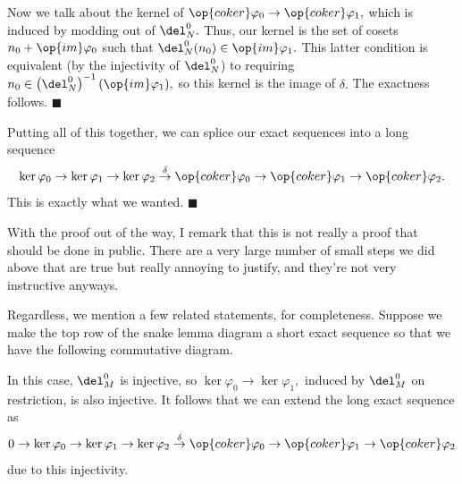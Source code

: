 Now we talk about the kernel of $\op{coker}\varphi_0\to\op{coker}\varphi_1,$ which is induced by modding out of $\del_N^0.$ Thus, our kernel is the set of cosets $n_0+\op{im}\varphi_0$ such that $\del_N^0(n_0)\in\op{im}\varphi_1.$ This latter condition is equivalent (by the injectivity of $\del_N^0$) to requiring $n_0\in\left(\del_N^0\right)^{-1}(\op{im}\varphi_1),$ so this kernel is the image of $\delta.$ The exactness follows. $\blacksquare$

Putting all of this together, we can splice our exact sequences into a long sequence
\[\ker\varphi_0\to\ker\varphi_1\to\ker\varphi_2\stackrel\delta\to\op{coker}\varphi_0\to\op{coker}\varphi_1\to\op{coker}\varphi_2.\]
This is exactly what we wanted. $\blacksquare$

With the proof out of the way, I remark that this is not really a proof that should be done in public. There are a very large number of small steps we did above that are true but really annoying to justify, and they're not very instructive anyways.

Regardless, we mention a few related statements, for completeness. Suppose we make the top row of the snake lemma diagram a short exact sequence so that we have the following commutative diagram.
\begin{center}
\end{center}
In this case, $\del_M^0$ is injective, so $\ker\varphi_0\to\ker\varphi_1,$ induced by $\del_M^0$ on restriction, is also injective. It follows that we can extend the long exact sequence as
\[0\to\ker\varphi_0\to\ker\varphi_1\to\ker\varphi_2\stackrel\delta\to\op{coker}\varphi_0\to\op{coker}\varphi_1\to\op{coker}\varphi_2\]
due to this injectivity.


